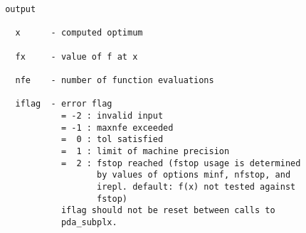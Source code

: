 \begin{verbatim}
 output

   x      - computed optimum

   fx     - value of f at x

   nfe    - number of function evaluations

   iflag  - error flag
            = -2 : invalid input
            = -1 : maxnfe exceeded
            =  0 : tol satisfied
            =  1 : limit of machine precision
            =  2 : fstop reached (fstop usage is determined
                   by values of options minf, nfstop, and
                   irepl. default: f(x) not tested against
                   fstop)
            iflag should not be reset between calls to
            pda_subplx.
\end{verbatim}




